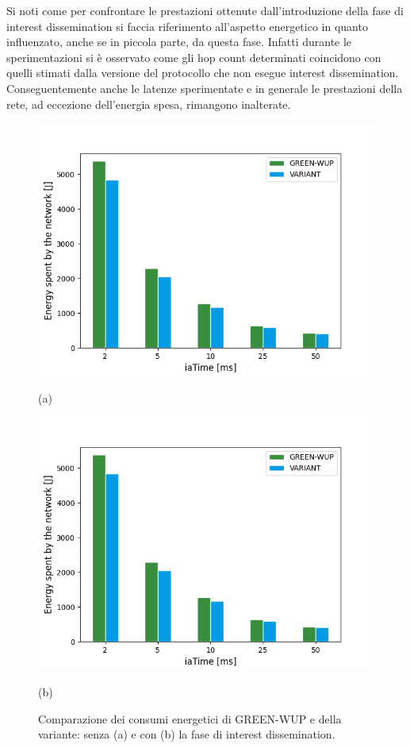\documentclass[binding=0.6cm,TFA]{sapthesis}
\begin{document}
Si noti come per confrontare le prestazioni ottenute dall'introduzione della fase di interest dissemination si faccia riferimento all'aspetto energetico in
quanto influenzato, anche se in piccola parte, da questa fase. Infatti durante le sperimentazioni si è osservato come gli hop count determinati
coincidono con quelli stimati dalla versione del protocollo che non esegue interest dissemination. Conseguentemente anche le latenze sperimentate
e in generale le prestazioni della rete, ad eccezione dell'energia spesa, rimangono inalterate.

\newpage

\begin{figure}
    \centering
    \begin{minipage}{.5\textwidth}
        \centering
        \includegraphics[width=1\linewidth]{energy_plot.png}
        \caption*{(a)}
    \end{minipage}%
    \begin{minipage}{.5\textwidth}
        \centering
        \includegraphics[width=1\linewidth]{interest_energy_plot.png}
        \caption*{(b)}
    \end{minipage}
    \caption{Comparazione dei consumi energetici di GREEN-WUP e della variante: senza (a) e con (b) la fase di interest dissemination.}
    \label{interest-plot}
\end{figure}
\end{document}

